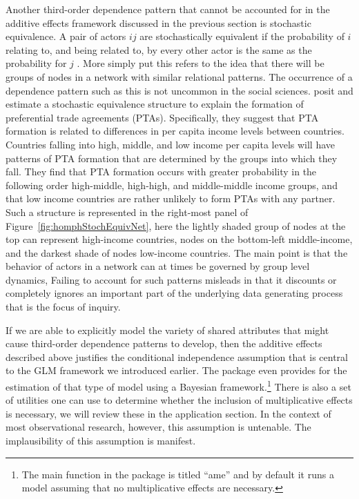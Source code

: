 Another third-order dependence pattern that cannot be accounted for in the additive effects framework discussed in the previous section is stochastic equivalence. A pair of actors $ij$ are stochastically equivalent if the probability of $i$ relating to, and being related to, by every other actor is the same as the probability for $j$ \citep{anderson:etal:1992}. More simply put this refers to the idea that there will be groups of nodes in a network with similar relational patterns. The occurrence of a dependence pattern such as this is not uncommon in the social sciences. \citet{manger:etal:2012} posit and estimate a stochastic equivalence structure to explain the formation of preferential trade agreements (PTAs). Specifically, they suggest that PTA formation is related to differences in per capita income levels between countries. Countries falling into high, middle, and low income per capita levels will have patterns of PTA formation that are determined by the groups into which they fall. They find that PTA formation occurs with greater probability in the following order high-middle, high-high, and middle-middle income groups, and that low income countries are rather unlikely to form PTAs with any partner. Such a structure is represented in the right-most panel of Figure~\ref{fig:homphStochEquivNet}, here the lightly shaded group of nodes at the top can represent high-income countries, nodes on the bottom-left middle-income, and the darkest shade of nodes low-income countries. The main point is that the behavior of actors in a network can at times be governed by group level dynamics, Failing to account for such patterns misleads in that it discounts or completely ignores an important part of the underlying data generating process that is the focus of inquiry. 

If we are able to explicitly model the variety of shared attributes that might cause third-order dependence patterns to develop, then the additive effects described above  justifies the conditional independence assumption that is central to the GLM framework we introduced earlier. The  package even provides for the estimation of that type of model using a Bayesian framework.\footnote{The main function in the  package is titled ``ame'' and by default it runs a model assuming that no multiplicative effects are necessary.} There is also a set of utilities one can use to determine whether the inclusion of multiplicative effects is necessary, we will review these in the application section. In the context of most observational research, however, this assumption is untenable. The implausibility of this assumption is manifest.

